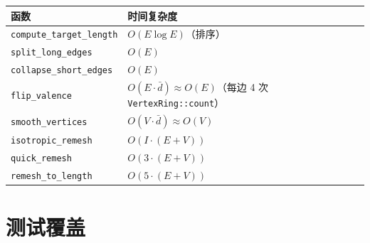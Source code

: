 \documentclass[11pt,a4paper]{article}
\begin{document}
\begin{center}
\renewcommand{\arraystretch}{1.18}
\begin{tabular}{@{}ll@{}}
  \toprule
  \textbf{函数} & \textbf{时间复杂度} \\
  \midrule
  \texttt{compute\_target\_length} & $O(E \log E)$（排序） \\
  \texttt{split\_long\_edges}      & $O(E)$ \\
  \texttt{collapse\_short\_edges}  & $O(E)$ \\
  \texttt{flip\_valence}           & $O(E \cdot \bar{d}) \approx O(E)$（每边 4 次 \texttt{VertexRing::count}） \\
  \texttt{smooth\_vertices}        & $O(V \cdot \bar{d}) \approx O(V)$ \\
  \texttt{isotropic\_remesh}       & $O(I \cdot (E + V))$ \\
  \texttt{quick\_remesh}           & $O(3 \cdot (E + V))$ \\
  \texttt{remesh\_to\_length}      & $O(5 \cdot (E + V))$ \\
  \bottomrule
\end{tabular}
\end{center}

\section{测试覆盖}
\end{document}
